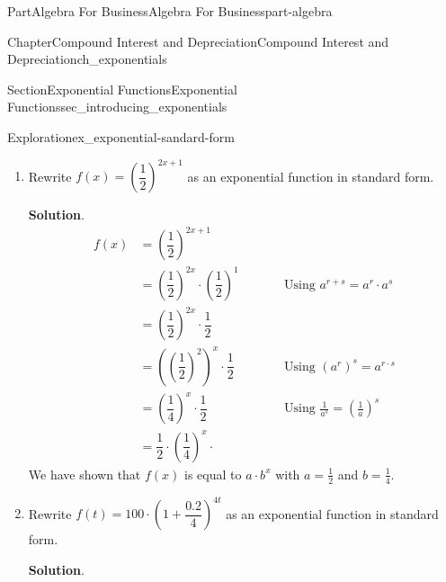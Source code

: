 \documentclass[oneside,10pt,]{tufte-book}
\newcommand{\blocktitlefont}{\relax}
\numberwithin{equation}{chapter}
\newcommand{\amp}{&}
\begin{document}
\begin{partptx}{Part}{Algebra For Business}{}{Algebra For Business}{}{}{part-algebra}
\begin{chapterptx}{Chapter}{Compound Interest and Depreciation}{}{Compound Interest and Depreciation}{}{}{ch_exponentials}
\begin{sectionptx}{Section}{Exponential Functions}{}{Exponential Functions}{}{}{sec_introducing_exponentials}
\begin{exploration}{Exploration}{}{ex_exponential-sandard-form}
\begin{enumerate}[font=\bfseries,label=(\alph*),ref=\alph*]
\begin{align*}
f(x) \amp = 2^{-2x} \amp \qquad\amp \\
\amp = \dfrac{1}{2^{2x}} \amp \qquad\amp \text{Using } a^{-r} = \frac{1}{a^r} \\
\amp = \dfrac{1}{ (2^2)^{x}} \amp \qquad\amp \text{Using } a^{r\cdot s} = (a^r)^s \\
\amp = \dfrac{1}{ (4)^{x}} \amp \qquad\amp   \\
\amp = \left(\dfrac{1}{ 4}\right)^{x} \amp \qquad\amp \text{Using } \frac{1}{a^{s}} =  \left(\frac{1}{a}\right)^s\\
\amp = {\color{red} 1\cdot} \left(0.25\right)^{x} \amp \qquad\amp 
\end{align*}
Note that in the second to last step, we only had a base and a power.  In the last step, we introduce a coefficient of \(1\), which does not change the value of the expression.%
\par
We have shown that \(f(x)\) is equal to \(a\cdot b^x\) with \(a=1\) and \(b=0.25\).%
\item{}Rewrite \(f(x) = \left(\dfrac{1}{2}\right)^{2x+1}\) as an exponential function in standard form.%
\par\smallskip%
\noindent\textbf{\blocktitlefont Solution}.\hypertarget{ex_exponential-sandard-form-3-2}{}\quad{}%
\begin{align*}
f(x) \amp = \left(\dfrac{1}{2}\right)^{2x+1} \amp \qquad\amp \\
\amp = \left(\dfrac{1}{2}\right)^{2x} \cdot \left(\dfrac{1}{2}\right)^{1} \amp \qquad\amp \text{Using } a^{r+s} =  a^r\cdot a^s\\
\amp = \left(\dfrac{1}{2}\right)^{2x} \cdot \dfrac{1}{2}  \amp \qquad\amp \\
\amp = \left(\left(\dfrac{1}{2}\right)^{2}\right)^x \cdot \dfrac{1}{2} \amp \qquad\amp \text{Using } {\left(a^{r}\right)}^s=  a^{r\cdot s}  \\
\amp = \left(\dfrac{1}{4}\right)^x \cdot \dfrac{1}{2} \amp \qquad\amp \text{Using } \frac{1}{a^{s}} =  \left(\frac{1}{a}\right)^s\\
\amp =  \dfrac{1}{2} \cdot \left(\dfrac{1}{4}\right)^x \cdot \amp 
\end{align*}
We have shown that \(f(x)\) is equal to \(a\cdot b^x\) with \(a=\frac{1}{2}\) and \(b=\frac{1}{4}\).%
\item{}Rewrite \(f(t) = 100 \cdot \left(1 + \dfrac{0.2}{4}\right)^{4t}\) as an exponential function in standard form.%
\par\smallskip%
\noindent\textbf{\blocktitlefont Solution}.\hypertarget{ex_exponential-sandard-form-4-2}{}\quad{}%

\end{enumerate}
\end{exploration}
\end{sectionptx}
\end{chapterptx}
\end{partptx}
\end{document}
